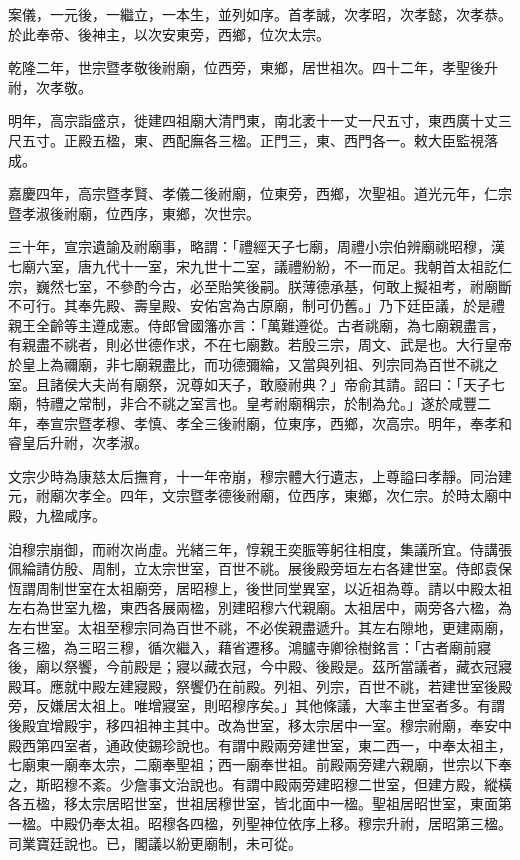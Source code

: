 \begin{pinyinscope}
案儀，一元後，一繼立，一本生，並列如序。首孝誠，次孝昭，次孝懿，次孝恭。於此奉帝、後神主，以次安東旁，西鄉，位次太宗。

乾隆二年，世宗暨孝敬後祔廟，位西旁，東鄉，居世祖次。四十二年，孝聖後升祔，次孝敬。

明年，高宗詣盛京，徙建四祖廟大清門東，南北袤十一丈一尺五寸，東西廣十丈三尺五寸。正殿五楹，東、西配廡各三楹。正門三，東、西門各一。敕大臣監視落成。

嘉慶四年，高宗暨孝賢、孝儀二後祔廟，位東旁，西鄉，次聖祖。道光元年，仁宗暨孝淑後祔廟，位西序，東鄉，次世宗。

三十年，宣宗遺諭及祔廟事，略謂：「禮經天子七廟，周禮小宗伯辨廟祧昭穆，漢七廟六室，唐九代十一室，宋九世十二室，議禮紛紛，不一而足。我朝首太祖訖仁宗，巍然七室，不參酌今古，必至貽笑後嗣。朕薄德承基，何敢上擬祖考，祔廟斷不可行。其奉先殿、壽皇殿、安佑宮為古原廟，制可仍舊。」乃下廷臣議，於是禮親王全齡等主遵成憲。侍郎曾國籓亦言：「萬難遵從。古者祧廟，為七廟親盡言，有親盡不祧者，則必世德作求，不在七廟數。若殷三宗，周文、武是也。大行皇帝於皇上為禰廟，非七廟親盡比，而功德彌綸，又當與列祖、列宗同為百世不祧之室。且諸侯大夫尚有廟祭，況尊如天子，敢廢祔典？」帝俞其請。詔曰：「天子七廟，特禮之常制，非合不祧之室言也。皇考祔廟稱宗，於制為允。」遂於咸豐二年，奉宣宗暨孝穆、孝慎、孝全三後祔廟，位東序，西鄉，次高宗。明年，奉孝和睿皇后升祔，次孝淑。

文宗少時為康慈太后撫育，十一年帝崩，穆宗體大行遺志，上尊謚曰孝靜。同治建元，祔廟次孝全。四年，文宗暨孝德後祔廟，位西序，東鄉，次仁宗。於時太廟中殿，九楹咸序。

洎穆宗崩御，而祔次尚虛。光緒三年，惇親王奕脤等躬往相度，集議所宜。侍講張佩綸請仿殷、周制，立太宗世室，百世不祧。展後殿旁垣左右各建世室。侍郎袁保恆謂周制世室在太祖廟旁，居昭穆上，後世同堂異室，以近祖為尊。請以中殿太祖左右為世室九楹，東西各展兩楹，別建昭穆六代親廟。太祖居中，兩旁各六楹，為左右世室。太祖至穆宗同為百世不祧，不必俟親盡遞升。其左右隙地，更建兩廟，各三楹，為三昭三穆，循次繼入，藉省遷移。鴻臚寺卿徐樹銘言：「古者廟前寢後，廟以祭饗，今前殿是；寢以藏衣冠，今中殿、後殿是。茲所當議者，藏衣冠寢殿耳。應就中殿左建寢殿，祭饗仍在前殿。列祖、列宗，百世不祧，若建世室後殿旁，反嫌居太祖上。唯增寢室，則昭穆序矣。」其他條議，大率主世室者多。有謂後殿宜增殿宇，移四祖神主其中。改為世室，移太宗居中一室。穆宗祔廟，奉安中殿西第四室者，通政使錫珍說也。有謂中殿兩旁建世室，東二西一，中奉太祖主，七廟東一廟奉太宗，二廟奉聖祖；西一廟奉世祖。前殿兩旁建六親廟，世宗以下奉之，斯昭穆不紊。少詹事文治說也。有謂中殿兩旁建昭穆二世室，但建方殿，縱橫各五楹，移太宗居昭世室，世祖居穆世室，皆北面中一楹。聖祖居昭世室，東面第一楹。中殿仍奉太祖。昭穆各四楹，列聖神位依序上移。穆宗升祔，居昭第三楹。司業寶廷說也。已，閣議以紛更廟制，未可從。


\end{pinyinscope}
